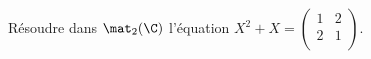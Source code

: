 \begin{enonce}
\begin{exercise}[ID={RMS 125 E827, 2014 Centrale PSI},subtitle={2014 Centrale PSI},tags={}, difficulty={0}]
  Résoudre dans $\mat_2(\C)$ l'équation $X^2+X= \begin{pmatrix} 1 & 2 \\ 2 & 1 \\ \end{pmatrix}$.
\end{exercise}
\begin{solution}
\end{solution}
\end{enonce}
